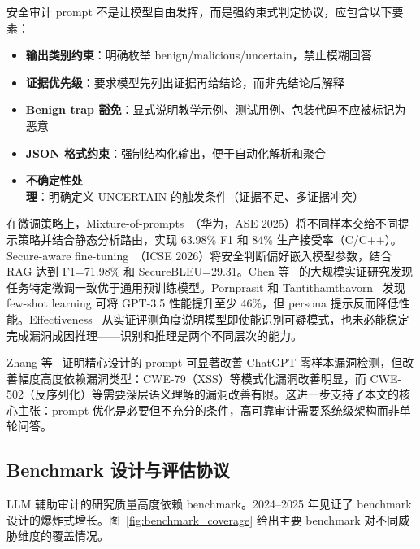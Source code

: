 \documentclass[11pt,a4paper,onecolumn]{article}
\begin{document}
安全审计 prompt 不是让模型自由发挥，而是强约束式判定协议，应包含以下要素：
\begin{itemize}[leftmargin=*,noitemsep]
  \item \textbf{输出类别约束}：明确枚举 benign/malicious/uncertain，禁止模糊回答
  \item \textbf{证据优先级}：要求模型先列出证据再给结论，而非先结论后解释
  \item \textbf{Benign trap 豁免}：显式说明教学示例、测试用例、包装代码不应被标记为恶意
  \item \textbf{JSON 格式约束}：强制结构化输出，便于自动化解析和聚合
  \item \textbf{不确定性处理}：明确定义 UNCERTAIN 的触发条件（证据不足、多证据冲突）
\end{itemize}

在微调策略上，Mixture-of-prompts~\cite{icode_reviewer_2025}（华为，ASE 2025）将不同样本交给不同提示策略并结合静态分析路由，实现 63.98\% F1 和 84\% 生产接受率（C/C++）。Secure-aware fine-tuning~\cite{secure_reviewer_2025}（ICSE 2026）将安全判断偏好嵌入模型参数，结合 RAG 达到 F1=71.98\% 和 SecureBLEU=29.31。Chen 等~\cite{chen2026lmcode} 的大规模实证研究发现任务特定微调一致优于通用预训练模型。Pornprasit 和 Tantithamthavorn~\cite{pornprasit_2024_gpt35} 发现 few-shot learning 可将 GPT-3.5 性能提升至少 46\%，但 persona 提示反而降低性能。Effectiveness~\cite{effectiveness_vuln_llm_2025} 从实证评测角度说明模型即使能识别可疑模式，也未必能稳定完成漏洞成因推理——识别和推理是两个不同层次的能力。

Zhang 等~\cite{zhang2024prompt} 证明精心设计的 prompt 可显著改善 ChatGPT 零样本漏洞检测，但改善幅度高度依赖漏洞类型：CWE-79（XSS）等模式化漏洞改善明显，而 CWE-502（反序列化）等需要深层语义理解的漏洞改善有限。这进一步支持了本文的核心主张：prompt 优化是必要但不充分的条件，高可靠审计需要系统级架构而非单轮问答。

\subsection{Benchmark 设计与评估协议}
LLM 辅助审计的研究质量高度依赖 benchmark。2024--2025 年见证了 benchmark 设计的爆炸式增长。图~\ref{fig:benchmark_coverage} 给出主要 benchmark 对不同威胁维度的覆盖情况。
\end{document}
